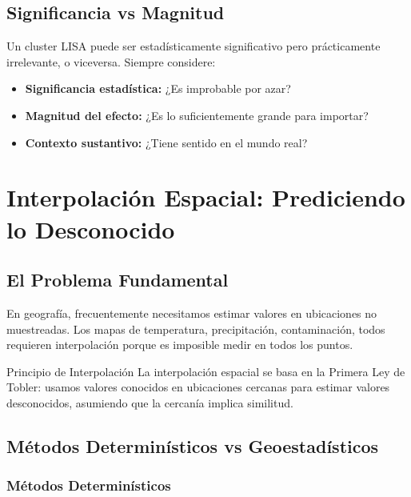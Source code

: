 \documentclass[12pt,a4paper]{article}
\begin{document}
\subsection{Significancia vs Magnitud}

\begin{alertbox}
Un cluster LISA puede ser estadísticamente significativo pero prácticamente irrelevante, o viceversa. Siempre considere:
\begin{itemize}
    \item \textbf{Significancia estadística:} ¿Es improbable por azar?
    \item \textbf{Magnitud del efecto:} ¿Es lo suficientemente grande para importar?
    \item \textbf{Contexto sustantivo:} ¿Tiene sentido en el mundo real?
\end{itemize}
\end{alertbox}

\section{Interpolación Espacial: Prediciendo lo Desconocido}

\subsection{El Problema Fundamental}

En geografía, frecuentemente necesitamos estimar valores en ubicaciones no muestreadas. Los mapas de temperatura, precipitación, contaminación, todos requieren interpolación porque es imposible medir en todos los puntos.

\begin{conceptbox}{Principio de Interpolación}
La interpolación espacial se basa en la Primera Ley de Tobler: usamos valores conocidos en ubicaciones cercanas para estimar valores desconocidos, asumiendo que la cercanía implica similitud.
\end{conceptbox}

\subsection{Métodos Determinísticos vs Geoestadísticos}

\subsubsection{Métodos Determinísticos}
\end{document}
